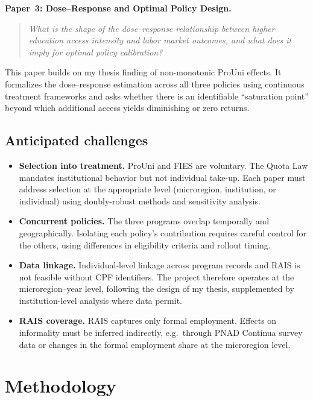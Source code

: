 \documentclass[a4paper,11pt]{article}
\begin{document}
\textbf{Paper~3: Dose--Response and Optimal Policy Design.}
\begin{quote}
\textit{What is the shape of the dose--response relationship between higher education access intensity and labor market outcomes, and what does it imply for optimal policy calibration?}
\end{quote}
This paper builds on my thesis finding of non-monotonic ProUni effects. It formalizes the dose--response estimation across all three policies using continuous treatment frameworks \citep{callaway2024} and asks whether there is an identifiable ``saturation point'' beyond which additional access yields diminishing or zero returns.

\subsection{Anticipated challenges}

\begin{itemize}[nosep]
    \item \textbf{Selection into treatment.} ProUni and FIES are voluntary. The Quota Law mandates institutional behavior but not individual take-up. Each paper must address selection at the appropriate level (microregion, institution, or individual) using doubly-robust methods and sensitivity analysis.
    \item \textbf{Concurrent policies.} The three programs overlap temporally and geographically. Isolating each policy's contribution requires careful control for the others, using differences in eligibility criteria and rollout timing.
    \item \textbf{Data linkage.} Individual-level linkage across program records and RAIS is not feasible without CPF identifiers. The project therefore operates at the microregion--year level, following the design of my thesis, supplemented by institution-level analysis where data permit.
    \item \textbf{RAIS coverage.} RAIS captures only formal employment. Effects on informality must be inferred indirectly, e.g.\ through PNAD Cont\'inua survey data or changes in the formal employment share at the microregion level.
\end{itemize}

\section{Methodology}
\end{document}
